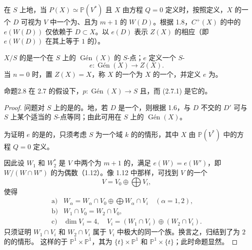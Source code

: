 在 $S$ 上地，当 $P(X)\simeq\mathbb P(V^*)$ 且 $X$ 由方程 $Q=0$ 定义时，按照定义，$X$ 的一个 $D$ 可视为 $V$ 中一个为、且为 $m+1$ 的 $W(D)$。根据 1.8，$C^+(X)$ 的中的 $e(W(D))$ 仅依赖于 $D\subset X$。以 $e(D)$ 表示 $Z(X)$ 的相应（即 $e(W(D))$ 在其上等于 $1$ 的）。

$X/S$ 的是一个在 $S$ 上的 $\operatorname{Gén}(X)$ 的 $S$-点；$e$ 定义一个 $S$-
\[
e:\operatorname{Gén}(X)\longrightarrow Z(X).\tag{2.7.1}
\]
当 $n=0$ 时，置 $Z(X)=X$，称 $X$ 的一个为 $X$ 的一个，并定义 $e$ 为。

\begin{SGAresult}{命题}{2.8}
在 2.7 的假设下，$p:\operatorname{Gén}(X)\to S$ 且，而 (2.7.1) 是它的。
\end{SGAresult}
\begin{proof}
问题对 $S$ 上的是的。地，若 $D$ 是一个，则根据 1.6，与 $D$ 不交的 $D'$ 可与 $S$ 上某个适当的 $S$-点等同；由此可用在 $S$ 上的 $\operatorname{Gén}(X)$。

为证明 $e$ 的是的，只须考虑 $S$ 为一个域 $k$ 的的情形，其中 $X$ 由 $\mathbb P(V^*)$ 中的方程 $Q=0$ 定义。

因此设 $W_1$ 和 $W_2^*$ 是 $V$ 中两个为 $m+1$ 的，满足 $e(W)=e(W')$，即 $W/(W\cap W')$ 的为偶数（1.12）。像 1.12 中那样，可找到 $V$ 的一个
\[
V=V_0\oplus\bigoplus V_i,
\]
使得
\[
\begin{array}{ll}
\text{a)}&W_\alpha=W_\alpha\cap V_0\oplus\bigoplus W_\alpha\cap V_i\quad(\alpha=1,2),\\
\text{b)}&W_1\cap V_0=W_2\cap V_0,\\
\text{c)}&\dim V_i=4,\quad V_i=(W_1\cap V_i)\oplus(W_2\cap V_i).
\end{array}
\]
只须证明 $W_1\cap V_i$ 和 $W_2\cap V_i$ 属于 $V_i$ 中极大的同一个族。换言之，归结到了为 $2$ 的的情形。
这样的于 $\mathbb P^1\times\mathbb P^1$，其为 $\{t\}\times\mathbb P^1$ 和 $\mathbb P^1\times\{t\}$；此时命题显然。
\end{proof}

